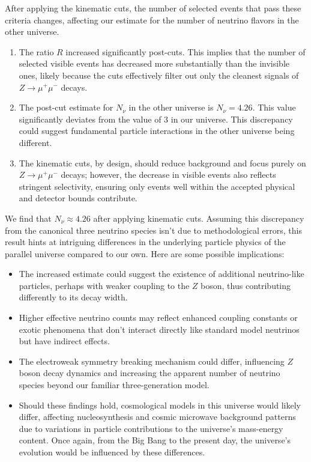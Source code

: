 After applying the kinematic cuts, the number of selected events that pass these criteria changes, affecting our estimate for the number of neutrino flavors in the other universe.


\begin{enumerate}
    \item The ratio \(R\) increased significantly post-cuts. This implies that the number of selected visible events has decreased more substantially than the invisible ones, likely because the cuts effectively filter out only the cleanest signals of \(Z \to \mu^+\mu^-\) decays.
    \item The post-cut estimate for $N_\nu$ in the other universe is \(N_\nu = 4.26\). This value significantly deviates from the value of 3 in our universe. This discrepancy could suggest  fundamental particle interactions in the other universe being different.
    \item The kinematic cuts, by design, should reduce background and focus purely on \(Z \to \mu^+\mu^-\) decays; however, the decrease in visible events also reflects stringent selectivity, ensuring only events well within the accepted physical and detector bounds contribute.
\end{enumerate}

We find that $N_\nu \approx 4.26$ after applying kinematic cuts. Assuming this discrepancy from the canonical three neutrino species isn't due to methodological errors, this result hints at intriguing differences in the underlying particle physics of the parallel universe compared to our own. Here are some possible implications:

\begin{itemize}[label=\(\ \star \)]
    \item  The increased estimate could suggest the existence of additional neutrino-like particles, perhaps with weaker coupling to the \(Z\) boson, thus contributing differently to its decay width.
    \item  Higher effective neutrino counts may reflect enhanced coupling constants or exotic phenomena  that don't interact directly like standard model neutrinos but have indirect effects.
    \item  The electroweak symmetry breaking mechanism could differ, influencing \(Z\) boson decay dynamics and increasing the apparent number of neutrino species beyond our familiar three-generation model.
  
    \item  Should these findings hold, cosmological models in this universe would likely differ, affecting nucleosynthesis and cosmic microwave background patterns due to variations in particle contributions to the universe's mass-energy content. Once again, from the Big Bang to the present day, the universe's evolution would be influenced by these differences.
\end{itemize}

